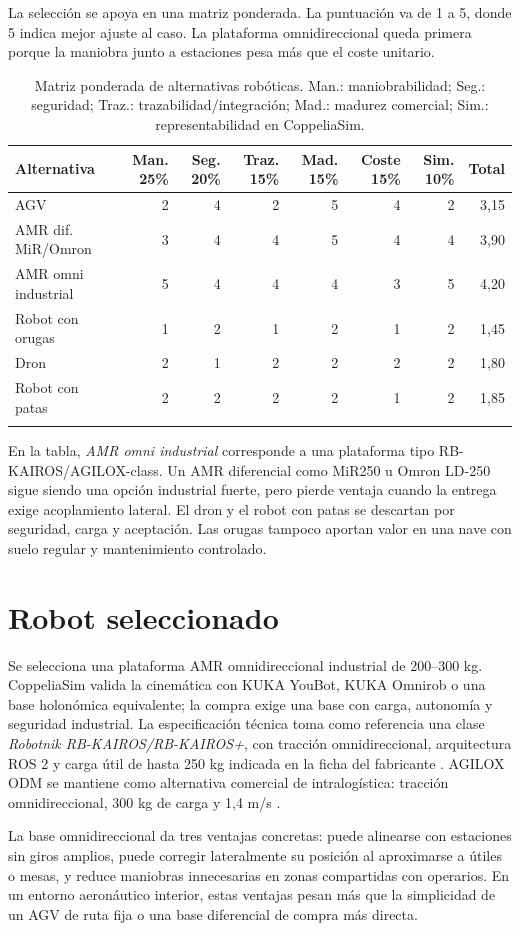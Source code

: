 La selección se apoya en una matriz ponderada. La puntuación va de 1 a 5, donde 5 indica mejor ajuste al caso. La plataforma omnidireccional queda primera porque la maniobra junto a estaciones pesa más que el coste unitario.

\begingroup
\small
\setlength{\tabcolsep}{3pt}
\begin{longtable}{P{0.22\textwidth}rrrrrrr}
\toprule
Alternativa & Man. 25\% & Seg. 20\% & Traz. 15\% & Mad. 15\% & Coste 15\% & Sim. 10\% & Total\\
\midrule
\endhead
AGV & 2 & 4 & 2 & 5 & 4 & 2 & 3,15\\
AMR dif. MiR/Omron & 3 & 4 & 4 & 5 & 4 & 4 & 3,90\\
AMR omni industrial & 5 & 4 & 4 & 4 & 3 & 5 & 4,20\\
Robot con orugas & 1 & 2 & 1 & 2 & 1 & 2 & 1,45\\
Dron & 2 & 1 & 2 & 2 & 2 & 2 & 1,80\\
Robot con patas & 2 & 2 & 2 & 2 & 1 & 2 & 1,85\\
\bottomrule
\caption{Matriz ponderada de alternativas robóticas. Man.: maniobrabilidad; Seg.: seguridad; Traz.: trazabilidad/integración; Mad.: madurez comercial; Sim.: representabilidad en CoppeliaSim.}
\label{tab:matriz-seleccion}
\end{longtable}
\endgroup

En la tabla, \textit{AMR omni industrial} corresponde a una plataforma tipo RB-KAIROS/AGILOX-class. Un AMR diferencial como MiR250 u Omron LD-250 sigue siendo una opción industrial fuerte, pero pierde ventaja cuando la entrega exige acoplamiento lateral. El dron y el robot con patas se descartan por seguridad, carga y aceptación. Las orugas tampoco aportan valor en una nave con suelo regular y mantenimiento controlado.

\section{Robot seleccionado}

Se selecciona una plataforma AMR omnidireccional industrial de 200--300 kg. CoppeliaSim valida la cinemática con KUKA YouBot, KUKA Omnirob o una base holonómica equivalente; la compra exige una base con carga, autonomía y seguridad industrial. La especificación técnica toma como referencia una clase \textit{Robotnik RB-KAIROS/RB-KAIROS+}, con tracción omnidireccional, arquitectura ROS 2 y carga útil de hasta 250 kg indicada en la ficha del fabricante \cite{robotnikRbKairos,robotnikRbKairosDatasheet}. AGILOX ODM se mantiene como alternativa comercial de intralogística: tracción omnidireccional, 300 kg de carga y 1,4 m/s \cite{agiloxOdm}.

La base omnidireccional da tres ventajas concretas: puede alinearse con estaciones sin giros amplios, puede corregir lateralmente su posición al aproximarse a útiles o mesas, y reduce maniobras innecesarias en zonas compartidas con operarios. En un entorno aeronáutico interior, estas ventajas pesan más que la simplicidad de un AGV de ruta fija o una base diferencial de compra más directa.
